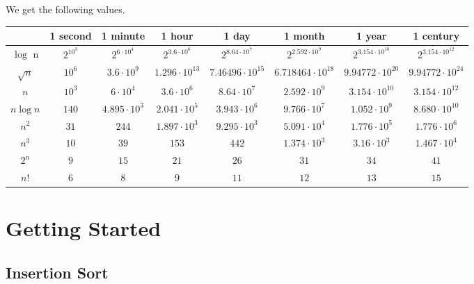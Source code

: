 \documentclass[oneside]{scrbook}
\theoremstyle{definition}
\begin{document}
\begin{problem}
    We get the following values.
    \begin{center}
    \begin{tabular}{ c|c|c|c|c|c|c|c| } 
     & 1 second & 1 minute & 1 hour & 1 day & 1 month & 1 year & 1 century \\
     \hline 
     $\log$ n & $2^{10^3}$ & $2^{6 \cdot 10^4}$  & $2^{3.6 \cdot 10^6}$ & $2^{8.64 \cdot 10^7}$ & $2^{2.592 \cdot 10^9}$ & $2^{3.154 \cdot 10^{10}}$ & $2^{3.154 \cdot 10^{12}}$ \\
     \hline
     $\sqrt{n}$ & $10^6$ & $3.6 \cdot 10^9$ & $1.296 \cdot 10^{13}$ & $7.46496 \cdot 10^{15}$ & $ 6.718464 \cdot 10^{18} $ & $9.94772 \cdot 10^{20}$ & $9.94772 \cdot 10^{24}$ \\
     \hline
     $n$ & $10^3$ & $6 \cdot 10^4$ & $3.6 \cdot 10^6$ & $8.64 \cdot 10^7$ & $2.592 \cdot 10^9$ & $3.154 \cdot 10^{10}$ & $3.154 \cdot 10^{12}$ \\
     \hline
     $n \log n$ & $140$ & $4.895 \cdot 10^3$ & $2.041 \cdot 10^5$ & $3.943 \cdot 10^6$ & $9.766 \cdot 10^7$ & $1.052 \cdot 10^9$ & $8.680 \cdot 10^{10}$ \\
     \hline
     $n^2$ & $31$ & $244$ & $1.897 \cdot 10^3$ & $9.295 \cdot 10^3$ & $5.091 \cdot 10^4$ & $1.776 \cdot 10^5$ & $1.776 \cdot 10^6$ \\
     \hline
     $n^3$ & $10$ & $39$ & $153$ & $442$ & $1.374 \cdot 10^3$ & $3.16 \cdot 10^3$ & $1.467 \cdot 10^4$ \\
     \hline
     $2^n$ & $9$ & $15$ & $21$ & $26$ & $31$ & $34$ & $41$ \\
     \hline
     $n!$ & $6$ & $8$ & $9$ & $11$ & $12$ & $13$ & $15$ \\
     \hline
    \end{tabular}
    \end{center}
\end{problem}

\chapter{Getting Started}

\section{Insertion Sort}

\begin{exercise}
\end{exercise}
\end{document}
